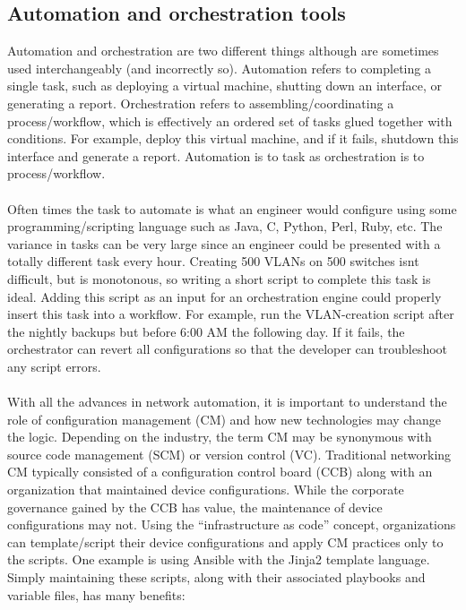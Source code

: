 \subsection{Automation and orchestration tools}
Automation and orchestration are two different things although are sometimes
used interchangeably (and incorrectly so). Automation refers to completing a
single task, such as deploying a virtual machine, shutting down an interface,
or generating a report. Orchestration refers to assembling/coordinating a
process/workflow, which is effectively an ordered set of tasks glued together
with conditions. For example, deploy this virtual machine, and if it fails,
shutdown this interface and generate a report. Automation is to task as
orchestration is to process/workflow.
\\ \\
Often times the task to automate is what an engineer would configure using
some programming/scripting language such as Java, C, Python, Perl, Ruby, etc.
The variance in tasks can be very large since an engineer could be presented
with a totally different task every hour. Creating 500 VLANs on 500 switches
isnt difficult, but is monotonous, so writing a short script to complete this
task is ideal. Adding this script as an input for an orchestration engine
could properly insert this task into a workflow. For example, run the
VLAN-creation script after the nightly backups but before 6:00 AM the
following day. If it fails, the orchestrator can revert all configurations so
that the developer can troubleshoot any script errors.
\\ \\
With all the advances in network automation, it is important to understand the
role of configuration management (CM) and how new technologies may change the
logic. Depending on the industry, the term CM may be synonymous with source
code management (SCM) or version control (VC). Traditional networking CM
typically consisted of a configuration control board (CCB) along with an
organization that maintained device configurations. While the corporate
governance gained by the CCB has value, the maintenance of device
configurations may not. Using the ``infrastructure as code'' concept,
organizations can template/script their device configurations and apply CM
practices only to the scripts. One example is using Ansible with the Jinja2
template language. Simply maintaining these scripts, along with their
associated playbooks and variable files, has many benefits:

